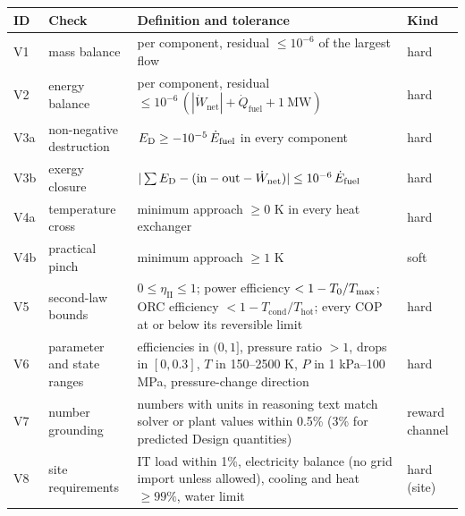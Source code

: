 \begingroup\small\renewcommand{\arraystretch}{1.15}
\begin{tabular}{@{}lp{3.3cm}p{7.6cm}p{1.9cm}@{}}
\toprule
ID & Check & Definition and tolerance & Kind \\
\midrule
V1 & mass balance & per component, residual $\le 10^{-6}$ of the largest flow & hard \\
V2 & energy balance & per component, residual $\le 10^{-6}\,(|\dot W_{\text{net}}|+\dot Q_{\text{fuel}}+1~\mathrm{MW})$ & hard \\
V3a & non-negative destruction & $E_{\mathrm{D}} \ge -10^{-5}\,\dot E_{\text{fuel}}$ in every component & hard \\
V3b & exergy closure & $|\sum E_{\mathrm{D}} - (\text{in} - \text{out} - \dot W_{\text{net}})| \le 10^{-6}\,\dot E_{\text{fuel}}$ & hard \\
V4a & temperature cross & minimum approach $\ge 0$ K in every heat exchanger & hard \\
V4b & practical pinch & minimum approach $\ge 1$ K & soft \\
V5 & second-law bounds & $0\le\eta_{\mathrm{II}}\le 1$; power efficiency $<1-T_0/T_{\max}$; ORC efficiency $<1-T_{\mathrm{cond}}/T_{\mathrm{hot}}$; every COP at or below its reversible limit & hard \\
V6 & parameter and state ranges & efficiencies in $(0,1]$, pressure ratio $>1$, drops in $[0,0.3]$, $T$ in 150--2500 K, $P$ in 1 kPa--100 MPa, pressure-change direction & hard \\
V7 & number grounding & numbers with units in reasoning text match solver or plant values within 0.5\% (3\% for predicted Design quantities) & reward channel \\
V8 & site requirements & IT load within 1\%, electricity balance (no grid import unless allowed), cooling and heat $\ge 99\%$, water limit & hard (site) \\
\bottomrule
\end{tabular}\endgroup
